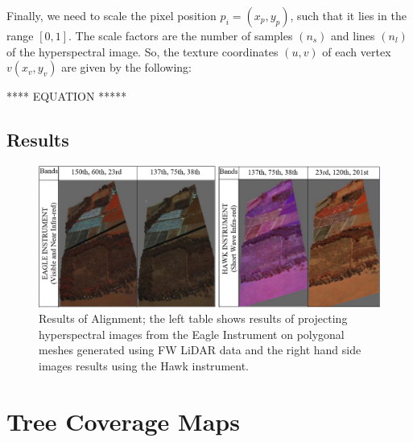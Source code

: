 \documentclass{subfiles}
\begin{document}
	\par Finally, we need to scale the pixel position $p_i = (x_p, y_p )$, such that it lies in the range $[0,1]$. The scale factors are the number of samples $(n_s)$ and lines $(n_l)$ of the hyperspectral image. So, the texture coordinates $(u, v)$ of each vertex $v(x_v , y_v)$ are given by the following:
		
		
	**** EQUATION *****
	
	\subsection {Results}
		
		  \begin{figure} [h!]
		  	\centering
		  	\includegraphics[width=\textwidth]{img/AlignmentEagle_Hawk}
		  	\caption[Results of Alignement]{Results of Alignment; the left table shows results of projecting hyperspectral images from the Eagle Instrument on polygonal meshes generated using FW LiDAR data and the right hand side images results using the Hawk instrument.}
		  	\label{fig:AlignementResults}
		  \end{figure}
		
		
\section{Tree Coverage Maps}
\end{document}
